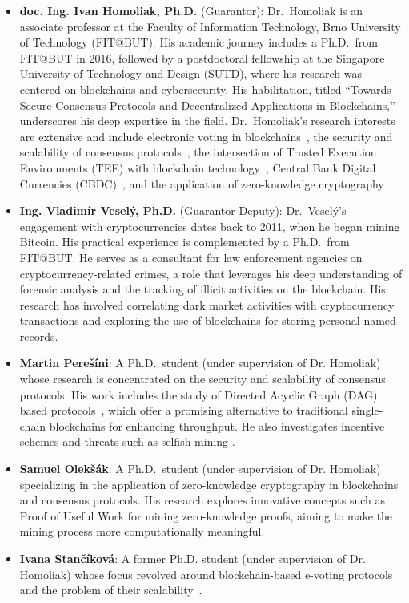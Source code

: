 \begin{itemize}
	\item
	\textbf{doc. Ing. Ivan Homoliak, Ph.D.} (Guarantor): Dr.~Homoliak is
	an associate professor at the Faculty of Information Technology, Brno
	University of Technology (FIT@BUT). His academic journey includes a
	Ph.D.~from FIT@BUT in 2016, followed by a postdoctoral fellowship at
	the Singapore University of Technology and Design (SUTD), where his
	research was centered on blockchains and cybersecurity. His
	habilitation, titled ``Towards Secure Consensus Protocols and
	Decentralized Applications in Blockchains,''  underscores his deep
	expertise in the field. Dr.~Homoliak's research interests are
	extensive and include electronic voting in blockchains~\cite{homoliak2023bbb,venugopalan2023always,stanvcikova2022sbvote,homoliak2025votemate}, the security
	and scalability of consensus protocols~\cite{perevsini2023incentive,perevsini2021dag,perevsini2023dag,budinsky2023fee}, the intersection of Trusted
	Execution Environments (TEE) with blockchain technology~\cite{homoliak2020aquareum}, Central Bank
	Digital Currencies (CBDC)~\cite{homoliak2023cbdc}, and the application of zero-knowledge
	cryptography~\cite{perevsini2025featherwallet} .
	\item
	\textbf{Ing. Vladimír Veselý, Ph.D.} (Guarantor Deputy): Dr.~Veselý's
	engagement with cryptocurrencies dates back to 2011, when he began
	mining Bitcoin. His practical experience is complemented by a
	Ph.D.~from FIT@BUT. He serves as a consultant for law enforcement
	agencies on cryptocurrency-related crimes, a role that leverages his
	deep understanding of forensic analysis and the tracking of illicit
	activities on the blockchain. His research has involved correlating
	dark market activities with cryptocurrency transactions and exploring
	the use of blockchains for storing personal named records.
	\item
	\textbf{Martin Perešíni}: A Ph.D.~student (under supervision of Dr. Homoliak) whose research is
	concentrated on the security and scalability of consensus protocols.
	His work includes the study of Directed Acyclic Graph (DAG) based
	protocols~\cite{perevsini2023incentive,perevsini2021dag,perevsini2023dag}, which offer a promising alternative to traditional
	single-chain blockchains for enhancing throughput. He also
	investigates incentive schemes and threats such as selfish mining .
	\item
	\textbf{Samuel Olekšák}: A Ph.D.~student (under supervision of Dr. Homoliak) specializing in the
	application of zero-knowledge cryptography in blockchains and
	consensus protocols. His research explores innovative concepts such as
	Proof of Useful Work for mining zero-knowledge proofs, aiming to make
	the mining process more computationally meaningful.
	\item
	\textbf{Ivana Stančíková}: A former Ph.D. student (under supervision of Dr. Homoliak) whose focus revolved around blockchain-based e-voting protocols and the problem of their scalability~\cite{venugopalan2023always,stanvcikova2022sbvote}.
\end{itemize}

